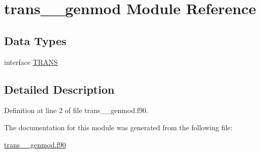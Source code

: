 \hypertarget{classtrans____genmod}{\section{trans\+\_\+\+\_\+genmod Module Reference}
\label{classtrans____genmod}
}
\subsection*{Data Types}
\begin{DoxyCompactItemize}
\item 
interface \hyperlink{interfacetrans____genmod_1_1TRANS}{T\+R\+A\+N\+S}
\end{DoxyCompactItemize}


\subsection{Detailed Description}


Definition at line 2 of file trans\+\_\+\+\_\+genmod.\+f90.



The documentation for this module was generated from the following file\+:\begin{DoxyCompactItemize}
\item 
\hyperlink{trans____genmod_8f90}{trans\+\_\+\+\_\+genmod.\+f90}\end{DoxyCompactItemize}
